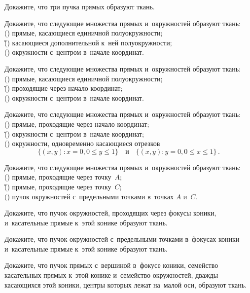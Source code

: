 \begin{problems}
\item
Докажите, что три пучка прямых образуют ткань.

\item
Докажите, что следующие множества прямых и~окружностей образуют ткань:
\\
({\R}) прямые, касающиеся единичной полуокружности;
\\
({\G}) касающиеся дополнительной к~ней полуокружности;
\\
({\B}) окружности с~центром в~начале координат.

\item
Докажите, что следующие множества прямых и~окружностей образуют ткань:
\\
({\R}) прямые, касающиеся единичной полуокружности;
\\
({\G}) проходящие через начало координат;
\\
({\B}) окружности с~центром в~начале координат.

\item
Докажите, что следующие множества прямых и~окружностей образуют ткань:
\\
({\R}) прямые, проходящие через начало координат;
\\
({\G}) окружности с~центром в~начале координат;
\\
({\B}) окружности, одновременно касающиеся отрезков
\[
    \{(x,y) \colon x = 0, 0 \leq y \leq 1\}
\quad\text{и}\quad
    \{(x,y) \colon y = 0, 0 \leq x \leq 1\}
\,.\]

\item
Докажите, что следующие множества прямых и~окружностей образуют ткань:
\\
({\R}) прямые, проходящие через точку~$A$;
\\
({\G}) прямые, проходящие через точку~$C$;
\\
({\B}) пучок окружностей с~предельными точками в~точках $A$ и~$C$.

\item
Докажите, что пучок окружностей, проходящих через фокусы коники, и~касательные
прямые к~этой конике образуют ткань.

\item
Докажите, что пучок окружностей с~предельными точками в~фокусах коники
и~касательные прямые к~этой конике образуют ткань.

\item
Докажите, что пучок прямых с~вершиной в~фокусе коники, семейство касательных
прямых к~этой конике и~семейство окружностей, дважды касающихся этой коники,
центры которых лежат на~малой оси, образуют ткань.

\end{problems}

